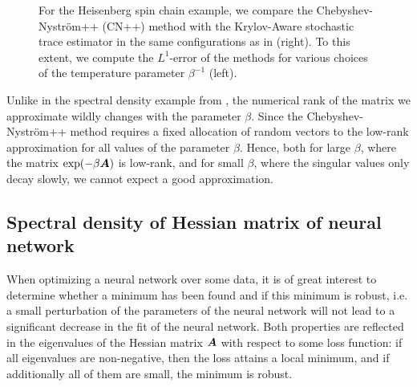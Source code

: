 \begin{figure}[ht]
    \begin{minipage}[c]{.475\linewidth}
        \centering
        
    \end{minipage}\hfill%
    \begin{minipage}[c]{.475\linewidth}
        \vspace{-35pt}
        
        \newline
        \vspace{15pt}
        \newline
        
    \end{minipage}
    \caption{For the Heisenberg spin chain example, we compare the Chebyshev-Nyström++ (CN++) method with the Krylov-Aware stochastic trace estimator in the same configurations as in \cite[Table 5.1]{chen-2023-krylovaware-stochastic} (right). To this extent, we compute the $L^1$-error of the methods for various choices of the temperature parameter $\beta^{-1}$ (left).}
    \label{fig:krylov-aware-spin}
\end{figure}

Unlike in the spectral density example from , the numerical rank of the matrix we approximate wildly changes with the parameter $\beta$. Since the Chebyshev-Nyström++ method requires a fixed allocation of random vectors to the low-rank approximation for all values of the parameter $\beta$. Hence, both for large $\beta$, where the matrix $\exp(-\beta \boldsymbol{A})$ is low-rank, and for small $\beta$, where the singular values only decay slowly, we cannot expect a good approximation.

\subsection{Spectral density of Hessian matrix of neural network}
\label{subsec:hessian}

When optimizing a neural network over some data, it is of great interest to determine whether a minimum has been found and if this minimum is robust, i.e. a small perturbation of the parameters of the neural network will not lead to a significant decrease in the fit of the neural network. Both properties are reflected in the eigenvalues of the Hessian matrix $\boldsymbol{A}$ with respect to some loss function: if all eigenvalues are non-negative, then the loss attains a local minimum, and if additionally all of them are small, the minimum is robust.


